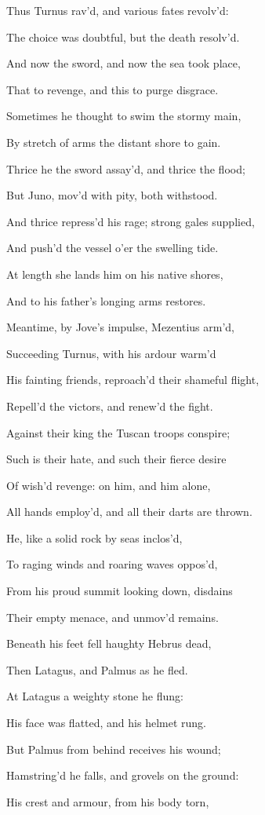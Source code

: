 Thus Turnus rav’d, and various fates revolv’d:

The choice was doubtful, but the death resolv’d.

And now the sword, and now the sea took place,

That to revenge, and this to purge disgrace.

Sometimes he thought to swim the stormy main,

By stretch of arms the distant shore to gain.

Thrice he the sword assay’d, and thrice the flood;

But Juno, mov’d with pity, both withstood.

And thrice repress’d his rage; strong gales supplied,

And push’d the vessel o’er the swelling tide.

At length she lands him on his native shores,

And to his father’s longing arms restores.

Meantime, by Jove’s impulse, Mezentius arm’d,

Succeeding Turnus, with his ardour warm’d

His fainting friends, reproach’d their shameful flight,

Repell’d the victors, and renew’d the fight.

Against their king the Tuscan troops conspire;

Such is their hate, and such their fierce desire

Of wish’d revenge: on him, and him alone,

All hands employ’d, and all their darts are thrown.

He, like a solid rock by seas inclos’d,

To raging winds and roaring waves oppos’d,

From his proud summit looking down, disdains

Their empty menace, and unmov’d remains.

Beneath his feet fell haughty Hebrus dead,

Then Latagus, and Palmus as he fled.

At Latagus a weighty stone he flung:

His face was flatted, and his helmet rung.

But Palmus from behind receives his wound;

Hamstring’d he falls, and grovels on the ground:

His crest and armour, from his body torn,

